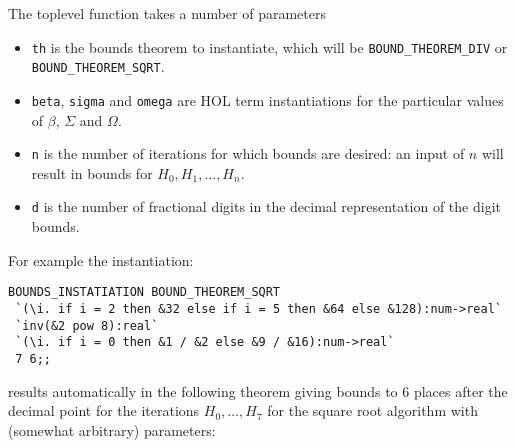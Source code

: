 \documentclass[10pt]{article}
\theoremstyle{definition}
\theoremstyle{remark}
\numberwithin{equation}{section}
\begin{document}
The toplevel function takes a number of parameters

\begin{itemize}

\item {\tt th} is the bounds theorem to instantiate, which will be
{\verb|BOUND_THEOREM_DIV|} or {\verb|BOUND_THEOREM_SQRT|}.

\item {\tt beta}, {\tt sigma} and {\tt omega} are HOL term instantiations for
the particular values of $\beta$, $\Sigma$ and $\Omega$.

\item {\tt n} is the number of iterations for which bounds are desired: an
input of $n$ will result in bounds for $H_0,H_1,\ldots,H_n$.

\item {\tt d} is the number of fractional digits in the decimal representation
of the digit bounds.

\end{itemize}

For example the instantiation:

\begin{scriptsize}\begin{verbatim}
BOUNDS_INSTATIATION BOUND_THEOREM_SQRT
 `(\i. if i = 2 then &32 else if i = 5 then &64 else &128):num->real`
 `inv(&2 pow 8):real`
 `(\i. if i = 0 then &1 / &2 else &9 / &16):num->real`
 7 6;;
\end{verbatim}\end{scriptsize}

\noindent results automatically in the following theorem giving bounds to 6
places after the decimal point for the iterations $H_0,\ldots,H_7$ for the
square root algorithm with (somewhat arbitrary) parameters:
\end{document}
